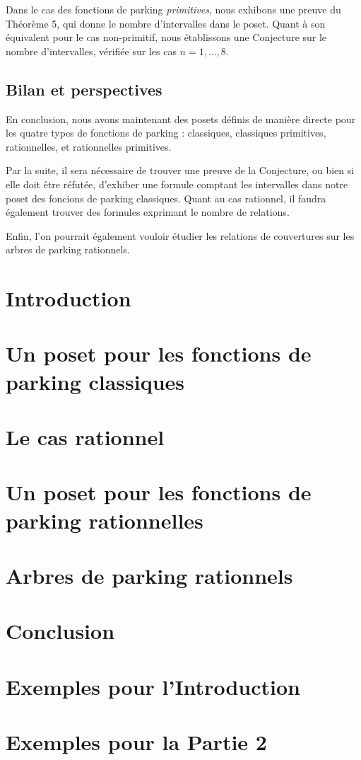\documentclass[11pt]{article}
\begin{document}
Dans le cas des fonctions de parking \emph{primitives}, nous exhibons
une preuve du Théorème 5, qui donne le nombre d'intervalles dans le
poset.
Quant à son équivalent pour le cas non-primitif, nous établissons une
Conjecture sur le nombre d'intervalles, vérifiée sur les cas
$n = 1, \ldots, 8$.

\subsection*{Bilan et perspectives}
En conclusion, nous avons maintenant des posets définis de manière
directe pour les quatre types de fonctions de parking : classiques, 
classiques primitives, rationnelles, et rationnelles primitives.

Par la suite, il sera nécessaire de trouver une preuve de la Conjecture,
ou bien si elle doit être réfutée, d'exhiber une formule comptant les
intervalles dans notre poset des foncions de parking classiques.
Quant au cas rationnel, il faudra également trouver des formules exprimant
le nombre de relations.

Enfin, l'on pourrait également vouloir étudier les relations de couvertures
sur les arbres de parking rationnels. 

\newpage

\tableofcontents

\section{Introduction}


\section{Un poset pour les fonctions de parking classiques}



\section{Le cas rationnel}

\section{Un poset pour les fonctions de parking rationnelles}


\section{Arbres de parking rationnels}


\section{Conclusion}





\appendix

\newpage
\section{Exemples pour l'Introduction}


\newpage
\section{Exemples pour la Partie 2}

\end{document}
